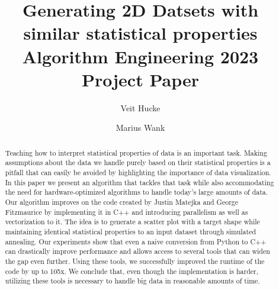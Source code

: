 \documentclass[sigconf]{acmart}
\begin{document}
\title[Generating 2D Datsets with similar statistical properties]{Generating 2D Datsets with similar statistical properties\\\large Algorithm Engineering 2023 Project Paper}


\author{Veit Hucke}

\author{Marius Wank}

\begin{abstract}

Teaching how to interpret statistical properties of data is an important task. Making assumptions about the data we handle purely based on their statistical properties 
is a pitfall that can easily be avoided by highlighting the importance of data visualization. In this paper we present an algorithm that tackles that task while also 
accommodating  the need for hardware-optimized algorithms to handle today’s  large amounts of data. Our algorithm improves on the code created by Justin Matejka and George 
Fitzmaurice by implementing it in C++ and introducing parallelism as well as vectorization to it. The idea is to generate a scatter plot with a target shape while maintaining 
identical statistical properties to an input dataset through simulated annealing. Our experiments show that even a naive conversion from Python to C++ can drastically
improve performance and allows access to several tools that can widen the gap even further. Using these tools, we successfully improved the runtime of the code by up to 105x.
We conclude that, even though the implementation is harder, utilizing these tools is necessary to handle big data in reasonable amounts of time.  

\end{abstract}
\end{document}

